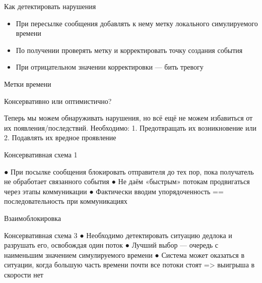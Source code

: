 \documentclass{beamer}
\begin{document}
\begin{frame}{Как детектировать нарушения}

\begin{itemize}
\item При пересылке сообщения добавлять к нему метку локального симулируемого времени
\item По получении проверять метку и корректировать точку создания события
\item При отрицательном значении корректировки — бить тревогу
\end{itemize}

\end{frame}

\begin{frame}{Метки времени}
\centering

\end{frame}

\begin{frame}{Консервативно или оптимистично?}

Теперь мы можем обнаруживать
нарушения, но всё ещё не можем
избавиться от их появления/последствий.
Необходимо:
1. Предотвращать их возникновение
или
2. Подавлять их вредное проявление

\end{frame}

\begin{frame}{Консервативная схема 1}

●
 При посылке сообщения блокировать
отправителя до тех пор, пока получатель не
обработает связанного события
●
 Не даём «быстрым» потокам продвигаться
через этапы коммуникации
●
 Фактически вводим упорядоченность ==
последовательность при коммуникациях

\end{frame}

\begin{frame}{}
\centering
    
\end{frame}

\begin{frame}{Взаимоблокировка}
\centering


\end{frame}

\begin{frame}{}
Консервативная схема 3
●
 Необходимо детектировать ситуацию
дедлока и разрушать его, освобождая
один поток
●
 Лучший выбор — очередь с наименьшим
значением симулируемого времени
●
 Система может оказаться в ситуации,
когда большую часть времени почти все
потоки стоят => выигрыша в скорости нет

\end{frame}
\end{document}
